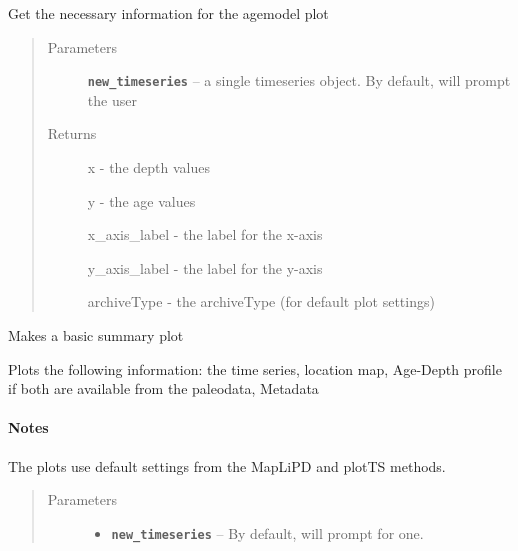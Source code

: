 \documentclass[letterpaper,10pt,english]{sphinxmanual}
\begin{document}
\begin{fulllineitems}
\begin{fulllineitems}
\end{fulllineitems}


\begin{fulllineitems}
\label{SummaryPlots:pyleoclim.SummaryPlots.agemodelData}
Get the necessary information for the agemodel plot
\begin{quote}\begin{description}
\item[{Parameters}] \leavevmode
\textbf{\texttt{new\_timeseries}} -- a single timeseries object. By default, will
prompt the user

\item[{Returns}] \leavevmode

x - the depth values

y - the age values

x\_axis\_label - the label for the x-axis

y\_axis\_label - the label for the y-axis

archiveType - the archiveType (for default plot settings)


\end{description}\end{quote}

\end{fulllineitems}


\begin{fulllineitems}
\label{SummaryPlots:pyleoclim.SummaryPlots.basic}
Makes a basic summary plot

Plots the following information: the time series, location map,
Age-Depth profile if both are available from the paleodata, Metadata
\paragraph{Notes}

The plots use default settings from the MapLiPD and plotTS methods.
\begin{quote}\begin{description}
\item[{Parameters}] \leavevmode\begin{itemize}
\item {} 
\textbf{\texttt{new\_timeseries}} -- By default, will prompt for one.


\end{itemize}
\end{description}
\end{quote}
\end{fulllineitems}
\end{fulllineitems}
\end{document}

